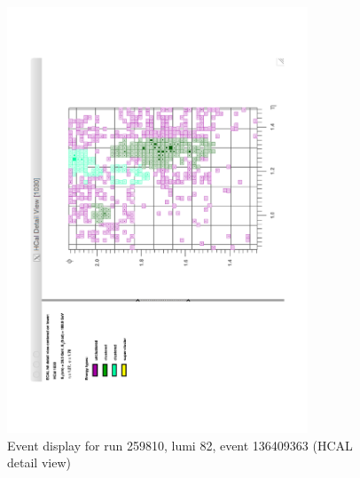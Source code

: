\begin{figure}[tbhp]
  \caption{Event display for run 259810, lumi 82, event 136409363 (HCAL detail view)}
  \label{fig:cmsShow_003}
  \begin{center}    
    \includegraphics[width=0.8\textwidth]{figures/susyResults/cmsShow_003}
  \end{center}
\end{figure}
